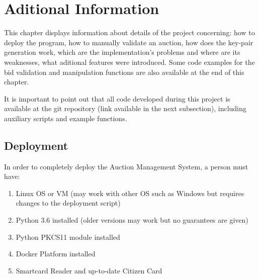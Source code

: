 \documentclass[a4paper]{article}
\begin{document}
\newpage
\section{Aditional Information} %
\label{sec:aditionalinformation}

This chapter displays information about details of the project concerning: how to deploy the program, how to manually validate an auction, how does the key-pair generation work, which are the implementation's problems and where are its weaknesses, what aditional features were introduced. Some code examples for the bid validation and manipulation functions are also available at the end of this chapter.

It is important to point out that all code developed during this project is available at the git repository (link available in the next subsection), including auxiliary scripts and example functions.

\subsection{Deployment}

In order to completely deploy the Auction Management System, a person must have:
\begin{enumerate}
\item Linux OS or VM (may work with other OS such as Windows but requires changes to the deployment script)
\item Python 3.6 installed (older versions may work but no guarantees are given)
\item Python PKCS11 module installed
\item Docker Platform installed
\item Smartcard Reader and up-to-date Citizen Card
\end{enumerate}
\end{document}
